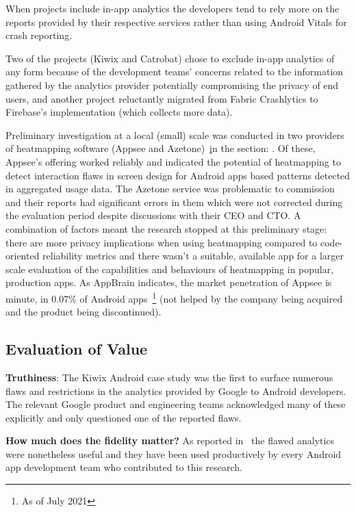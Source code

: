 When projects include in-app analytics the developers tend to rely more on the reports provided by their respective services rather than using Android Vitals for crash reporting. 

Two of the projects (Kiwix and Catrobat) chose to exclude in-app analytics of any form because of the development teams' concerns related to the information gathered by the analytics provider potentially compromising the privacy of end users, and another project reluctantly migrated from Fabric Crashlytics to Firebase's implementation (which collects more data).

Preliminary investigation at a local (small) scale was conducted in two providers of heatmapping software (Appsee and Azetone)~\href{section-heatmapping} in the section: {}. Of these, Appsee's offering worked reliably and indicated the potential of heatmapping to detect interaction flaws in screen design for Android apps based patterns detected in aggregated usage data. The Azetone service was problematic to commission and their reports had significant errors in them which were not corrected during the evaluation period despite discussions with their CEO and CTO. A combination of factors meant the research stopped at this preliminary stage: there are more privacy implications when using heatmapping compared to code-oriented reliability metrics and there wasn't a suitable, available app for a larger scale evaluation of the capabilities and behaviours of heatmapping in popular, production apps. As AppBrain indicates, the market penetration of Appsee is minute, in 0.07\% of Android apps~\footnote{As of  July 2021} (not helped by the company being acquired and the product being discontinued).

\subsection{Evaluation of Value}
\textbf{Truthiness}: The Kiwix Android case study was the first to surface numerous flaws and restrictions in the analytics provided by Google to Android developers. The relevant Google product and engineering teams acknowledged many of these explicitly and only questioned one of the reported flaws.

\textbf{How much does the fidelity matter?} As reported in~\citep{harty_improving_app_quality_despite_flawed_mobile_analytics} the flawed analytics were nonetheless useful and they have been used productively by every Android app development team who contributed to this research.

